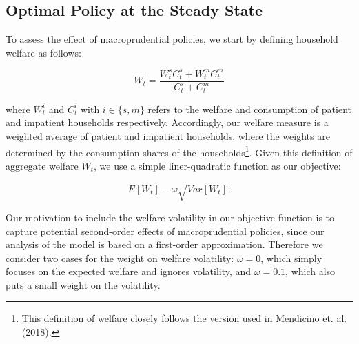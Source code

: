 \documentclass[12pt]{article}
\numberwithin{equation}{section}
\begin{document}
\subsection{Optimal Policy at the Steady State }


To assess the effect of macroprudential policies, we start by defining household welfare as follows: 

$$ W_t = \frac{W^s_t C^s_t + W^m_t C^m_t}{C^s_t + C^m_t} $$

where $W_t^i$  and $C_t^i$ with $i \in \{s,m \}$ refers to the welfare and consumption of patient and impatient households respectively. Accordingly, our welfare measure is a weighted average of patient and impatient households, where the weights are determined by the consumption shares of the households\footnote{This definition of welfare closely follows the version used in Mendicino et. al. (2018).}. Given this definition of aggregate welfare $W_t$, we use a simple liner-quadratic function as our objective:   

$$ E[W_t] - \omega \sqrt{Var[W_t]}.$$

Our motivation to include the welfare volatility in our objective function is to capture potential second-order effects of macroprudential policies, since our analysis of the model is based on a first-order approximation. Therefore we consider two cases for the weight on welfare volatility: $\omega=0$, which simply focuses on the expected welfare and ignores volatility, and $\omega=0.1$, which also puts a small weight on the volatility. 
\end{document}

